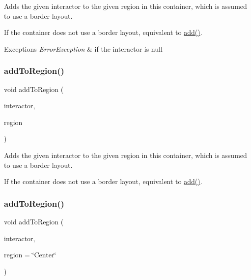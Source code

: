 Adds the given interactor to the given region in this container, which is assumed to use a border layout. 

If the container does not use a border layout, equivalent to \mbox{\hyperlink{classGContainer_a6f99b7c841256dbdc5acaafbbca4e685}{add()}}. 
\begin{DoxyExceptions}{Exceptions}
{\em Error\+Exception} & if the interactor is null \\
\hline
\end{DoxyExceptions}
\mbox{\label{classGContainer_ad05df0d92ab2fba95d401a5614365558}} 
\subsubsection{\texorpdfstring{add\+To\+Region()}{addToRegion()}\hspace{0.1cm}{\footnotesize\ttfamily [3/4]}}
{\footnotesize\ttfamily void add\+To\+Region (\begin{DoxyParamCaption}\item[{\mbox{\hyperlink{classGInteractor}{G\+Interactor}} \&}]{interactor,  }\item[{\mbox{\hyperlink{classGContainer_a81a01a86de31071a92e6cce0bab9bc4b}{Region}}}]{region }\end{DoxyParamCaption})\hspace{0.3cm}{\ttfamily [virtual]}}



Adds the given interactor to the given region in this container, which is assumed to use a border layout. 

If the container does not use a border layout, equivalent to \mbox{\hyperlink{classGContainer_a6f99b7c841256dbdc5acaafbbca4e685}{add()}}. \mbox{\label{classGContainer_a667ed0065e0bbb52a893904e7f2383bb}} 
\subsubsection{\texorpdfstring{add\+To\+Region()}{addToRegion()}\hspace{0.1cm}{\footnotesize\ttfamily [4/4]}}
{\footnotesize\ttfamily void add\+To\+Region (\begin{DoxyParamCaption}\item[{\mbox{\hyperlink{classGInteractor}{G\+Interactor}} \&}]{interactor,  }\item[{const std\+::string \&}]{region = {\ttfamily \char`\"{}Center\char`\"{}} }\end{DoxyParamCaption})\hspace{0.3cm}{\ttfamily [virtual]}}




